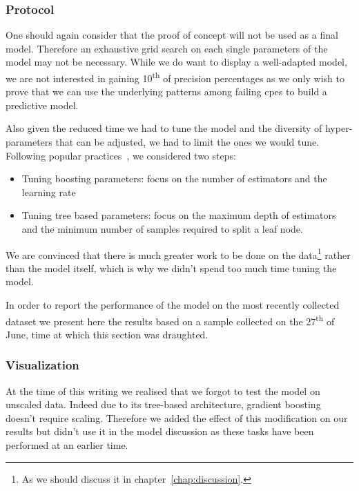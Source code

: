 \subsubsection{Protocol}
One should again consider that the proof of concept will not be used as a final model. Therefore an exhaustive grid search on each single parameters of the model may not be necessary. While we do want to display a well-adapted model, we are not interested in gaining 10\textsuperscript{th} of precision percentages as we only wish to prove that we can use the underlying patterns among failing \acrshort{cpe}s to build a predictive model.

Also given the reduced time we had to tune the model and the diversity of hyper-parameters that can be adjusted, we had to limit the ones we would tune. Following popular practices~\cite{tuningGB}, we considered two steps:
\begin{itemize}
\item Tuning boosting parameters: focus on the number of estimators and the learning rate
\item Tuning tree based parameters: focus on the maximum depth of estimators and the minimum number of samples required to split a leaf node.
\end{itemize}
We are convinced that there is much greater work to be done on the data\footnote{As we should discuss it in chapter~\ref{chap:discussion}.} rather than the model itself, which is why we didn't spend too much time tuning the model. 

In order to report the performance of the model on the most recently collected dataset we present here the results based on a sample collected on the 27\textsuperscript{th} of June, time at which this section was draughted.

\subsubsection{Visualization}
At the time of this writing we realised that we forgot to test the model on unscaled data. Indeed due to its tree-based architecture, gradient boosting doesn't require scaling. Therefore we added the effect of this modification on our results but didn't use it in the model discussion as these tasks have been performed at an earlier time. 

